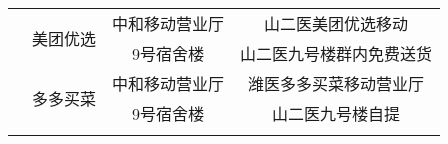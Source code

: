 \begin{table}[H]
\begin{tabular}{|c|c|c|c|}
                              & \multirow{2}{*}{美团优选} & 中和移动营业厅    & 山二医美团优选移动                    \\
        \cline{3-4}
                              &                       & 9号宿舍楼      & 山二医九号楼群内免费送货                 \\
        \cline{2-4}
                              & \multirow{2}{*}{多多买菜} & 中和移动营业厅    & 潍医多多买菜移动营业厅                  \\
        \cline{3-4}
                              &                       & 9号宿舍楼      & 山二医九号楼自提                     \\
        \Xhline{1.2pt}
    \end{tabular}
\end{table}